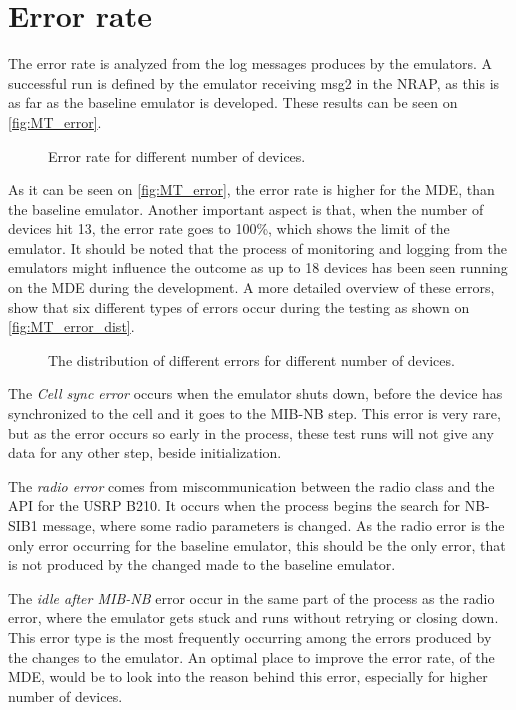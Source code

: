 \section{Error rate}
\label{sec:MTerror}
The error rate is analyzed from the log messages produces by the emulators. A successful run is defined by the emulator receiving msg2 in the NRAP, as this is as far as the baseline emulator is developed. These results can be seen on \autoref{fig:MT_error}.

\begin{figure}[H]
\centering

\caption{Error rate for different number of devices.}
\label{fig:MT_error}
\end{figure}

As it can be seen on \autoref{fig:MT_error}, the error rate is higher for the MDE, than the baseline emulator. Another important aspect is that, when the number of devices hit 13, the error rate goes to 100\%, which shows the limit of the emulator. It should be noted that the process of monitoring and logging from the emulators might influence the outcome as up to 18 devices has been seen running on the MDE during the development. A more detailed overview of these errors, show that six different types of errors occur during the testing as shown on \autoref{fig:MT_error_dist}.

\begin{figure}[H]
\centering
\resizebox{\textwidth}{!}{
}
\caption{The distribution of different errors for different number of devices.}
\label{fig:MT_error_dist}
\end{figure}

The \textit{Cell sync error} occurs when the emulator shuts down, before the device has synchronized to the cell and it goes to the MIB-NB step. This error is very rare, but as the error occurs so early in the process, these test runs will not give any data for any other step, beside initialization.

The \textit{radio error} comes from miscommunication between the radio class and the API for the USRP B210. It occurs when the process begins the search for NB-SIB1 message, where some radio parameters is changed. As the radio error is the only error occurring for the baseline emulator, this should be the only error, that is not produced by the changed made to the baseline emulator.

The \textit{idle after MIB-NB} error occur in the same part of the process as the radio error, where the emulator gets stuck and runs without retrying or closing down. This error type is the most frequently occurring among the errors produced by the changes to the emulator. An optimal place to improve the error rate, of the MDE, would be to look into the reason behind this error, especially for higher number of devices.


